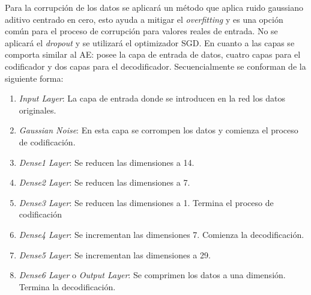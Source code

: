   Para la corrupci\'{o}n de los datos se aplicar\'{a} un m\'{e}todo que aplica ruido gaussiano aditivo centrado en cero, esto ayuda a mitigar el \textit{overfitting} y es una opci\'{o}n com\'{u}n para el proceso de corrupci\'{o}n para valores reales de entrada. No se aplicar\'{a} el \textit{dropout} y se utilizar\'{a} el optimizador SGD. En cuanto a las capas se comporta similar al AE: posee la capa de entrada de datos, cuatro capas para el codificador y dos capas para el decodificador. Secuencialmente se conforman de la siguiente forma:

\begin{enumerate}
	\item \textit{Input Layer}: La capa de entrada donde se introducen en la red los datos originales.
	\item \textit{Gaussian Noise}: En esta capa se corrompen los datos y comienza el proceso de codificaci\'{o}n.
	\item \textit{Dense1 Layer}: Se reducen las dimensiones a 14.
	\item \textit{Dense2 Layer}: Se reducen las dimensiones a 7.
	\item \textit{Dense3 Layer}: Se reducen las dimensiones a 1. Termina el proceso de codificaci\'{o}n
	\item \textit{Dense4 Layer}: Se incrementan las dimensiones 7. Comienza la decodificaci\'{o}n.
	\item \textit{Dense5 Layer}: Se incrementan las dimensiones a 29.
	\item \textit{Dense6 Layer} o \textit{Output Layer}: Se comprimen los datos a una dimensi\'{o}n. Termina la decodificaci\'{o}n.
\end{enumerate}

